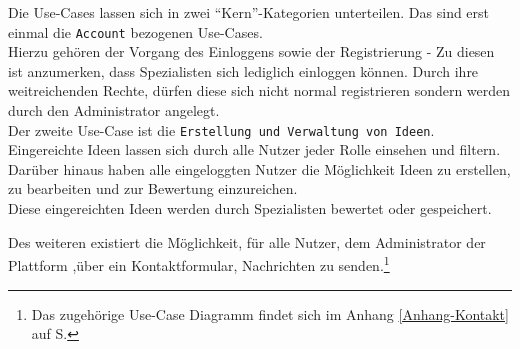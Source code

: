 Die Use-Cases lassen sich in zwei \enquote{Kern}-Kategorien unterteilen.
Das sind erst einmal die \texttt{Account} bezogenen Use-Cases.\\
Hierzu gehören der Vorgang des Einloggens sowie der Registrierung - Zu diesen ist anzumerken, dass Spezialisten sich lediglich einloggen können.
Durch ihre weitreichenden Rechte, dürfen diese sich nicht normal registrieren sondern werden  durch den Administrator angelegt.\\
Der zweite Use-Case ist die \texttt{Erstellung und Verwaltung von Ideen}.\\
Eingereichte Ideen lassen sich durch alle Nutzer jeder Rolle einsehen und filtern. Darüber hinaus haben alle eingeloggten Nutzer die Möglichkeit Ideen zu erstellen, zu bearbeiten und zur Bewertung einzureichen.\\
Diese eingereichten Ideen werden durch Spezialisten bewertet oder gespeichert.

Des weiteren existiert die Möglichkeit, für alle Nutzer, dem Administrator der Plattform ,über ein Kontaktformular, Nachrichten zu senden.\footnote{Das zugehörige Use-Case Diagramm findet sich im Anhang \ref{Anhang-Kontakt} auf S.\pageref{Anhang-Kontakt}}